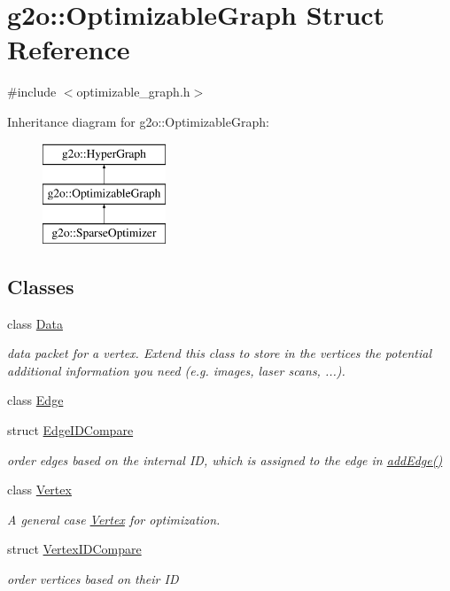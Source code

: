 \hypertarget{structg2o_1_1_optimizable_graph}{}\section{g2o\+:\+:Optimizable\+Graph Struct Reference}
\label{structg2o_1_1_optimizable_graph}


{\ttfamily \#include $<$optimizable\+\_\+graph.\+h$>$}

Inheritance diagram for g2o\+:\+:Optimizable\+Graph\+:\begin{figure}[H]
\begin{center}
\leavevmode
\includegraphics[height=3.000000cm]{structg2o_1_1_optimizable_graph}
\end{center}
\end{figure}
\subsection*{Classes}
\begin{DoxyCompactItemize}
\item 
class \mbox{\hyperlink{classg2o_1_1_optimizable_graph_1_1_data}{Data}}
\begin{DoxyCompactList}\small\item\em data packet for a vertex. Extend this class to store in the vertices the potential additional information you need (e.\+g. images, laser scans, ...). \end{DoxyCompactList}\item 
class \mbox{\hyperlink{classg2o_1_1_optimizable_graph_1_1_edge}{Edge}}
\item 
struct \mbox{\hyperlink{structg2o_1_1_optimizable_graph_1_1_edge_i_d_compare}{Edge\+I\+D\+Compare}}
\begin{DoxyCompactList}\small\item\em order edges based on the internal ID, which is assigned to the edge in \mbox{\hyperlink{structg2o_1_1_optimizable_graph_a6831ed69fce3dba691f53302a2813070}{add\+Edge()}} \end{DoxyCompactList}\item 
class \mbox{\hyperlink{classg2o_1_1_optimizable_graph_1_1_vertex}{Vertex}}
\begin{DoxyCompactList}\small\item\em A general case \mbox{\hyperlink{classg2o_1_1_optimizable_graph_1_1_vertex}{Vertex}} for optimization. \end{DoxyCompactList}\item 
struct \mbox{\hyperlink{structg2o_1_1_optimizable_graph_1_1_vertex_i_d_compare}{Vertex\+I\+D\+Compare}}
\begin{DoxyCompactList}\small\item\em order vertices based on their ID \end{DoxyCompactList}\end{DoxyCompactItemize}
